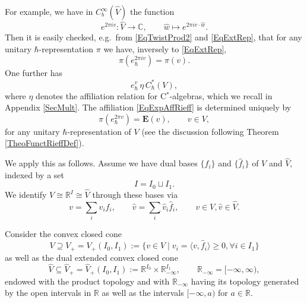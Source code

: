 \documentclass[11pt, reqno]{amsart}
\theoremstyle{definition}
\numberwithin{equation}{section}
\def\C{\mathbb C}
\def\R{\mathbb R}
\newcommand{\eb}{\mathbf{E}}
\begin{document}
For example, we have in $C_b^{\infty}(\hat{V})$ the function
\begin{equation}
e^{2\pi i v}\colon  \hat{V} \rightarrow \C,\qquad \hat{w}\mapsto e^{2\pi i v\cdot \hat{w}}.
\end{equation}
Then it is easily checked, e.g.\ from \eqref{EqTwistProd2} and \eqref{EqExtRep}, that for any unitary $\hbar$-representation $\pi$ we have, inversely to \eqref{EqExtRep},
\begin{equation}\label{EqCorrCanEl}
\pi(e_{\hbar}^{2\pi iv}) = \pi(v). 
\end{equation}
One further has 
\begin{equation}\label{EqExpAffRieff}
e_{\hbar}^v \,\eta\, C_{\hbar}^*(V),
\end{equation}
where $\eta$ denotes the affiliation relation for C$^*$-algebras, which we recall in Appendix \ref{SecMult}. The affiliation \eqref{EqExpAffRieff} is determined uniquely by
\begin{equation}\label{EqChare}
\pi(e_{\hbar}^{2\pi v}) = \eb(v), \qquad v\in V,
\end{equation}
for any unitary $\hbar$-representation of $V$ (see the discussion following Theorem \ref{TheoFunctRieffDef}). 

We apply this as follows. Assume we have dual bases $\{f_i\}$ and $\{\hat{f}_i\}$ of $V$ and $\hat{V}$, indexed by a set
\begin{equation}
I = I_0 \sqcup I_1.
\end{equation}
We identify $V \cong \R^I \cong \hat{V}$ through these bases via
\[
v  = \sum_i v_i f_i,\qquad \hat{v} = \sum_i \hat{v}_i\hat{f}_i,\qquad v\in V,\hat{v}\in \hat{V}.
\]

Consider the convex closed cone 
\begin{equation}\label{EqDualCone}
V \supseteq V_+ = V_+(I_0,I_1) := \{v\in V \mid v_i = \langle v,\hat{f}_i\rangle \geq 0,\forall i\in I_1\}
\end{equation}
as well as the dual extended convex closed cone 
\begin{equation}\label{EqExtCone}
\hat{V}\subseteq \hat{V}_+ = \hat{V}_+(I_0,I_1) := \R^{I_0} \times \R_{-\infty}^{I_1},\qquad \R_{-\infty} = [-\infty,\infty),
\end{equation}
endowed with the product topology and with $\R_{-\infty}$ having its topology generated by the open intervals in $\R$ as well as the intervals $[-\infty,a)$ for $a\in \R$.
\end{document}
